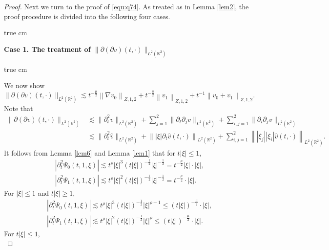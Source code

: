 \documentclass[11pt,twoside]{article}
\newcommand{\R}{\mathbb R}
\newcommand{\p}{\partial}
\newcommand{\f}{\frac}
\theoremstyle{plain}
\theoremstyle{definition}
\theoremstyle{remark}
\numberwithin{equation}{section}
\begin{document}
\begin{proof}
Next we turn to the proof of \eqref{equ:q74}. As treated as in  Lemma \ref{lem2}, the proof
procedure is divided into the following four cases.

 true cm

{\bf Case 1.  The treatment  of $\|\p(\p v)(t, \cdot)\|_{L^2(\R^2)}$ }

 true cm

We now show
\begin{equation}\label{equ:q78}
\|\p(\p v)(t, \cdot)\|_{L^2(\R^2)} \lesssim t^{-\f{\mu}{2}}\left\|\nabla v_0\right\|_{Z, 1, 2}
+t^{-\f{\mu}{2}}\left\|v_1\right\|_{Z, 1,2}+t^{-1}\left\|v_0+v_1\right\|_{Z, 1, 2}.
\end{equation}
Note that
\begin{equation}\label{equ:q78-1}
\begin{aligned}
\|\p(\p v)(t, \cdot)\|_{L^2(\R^2)} & \lesssim\|\p_t^2v\|_{L^2(\R^2)}+\sum_{j=1}^2\|\p_t\p_jv\|_{L^2(\R^2)}+\sum_{i,j=1}^2\|\p_i\p_jv\|_{L^2(\R^2)}\\
& \lesssim \|\p_t^2\hat{v}\|_{L^2(\R^2)}+\left\||\xi|\p_t\hat{v}(t, \cdot)\right\|_{L^2(\R^2)}+ \sum_{i,j=1}^2\left\||\xi_j||\xi_i|\hat{v}(t, \cdot)\right\|_{L^2(\R^2)}.
\end{aligned}
\end{equation}
It follows from Lemma \ref{lem6} and Lemma \ref{lem1} that for $t|\xi|\leq1$,
\begin{equation}\label{p-1}
\begin{aligned}
& \left|\p_t^2\Psi_0(t, 1,\xi)\right| \lesssim t^\rho|\xi|^3(t|\xi|)^{-\f{1}{2}}|\xi|^{-\f{1}{2}}= t^{-\frac{\mu}{2}}|\xi|\cdot|\xi|, \\
& \left|\p_t^2\Psi_1(t, 1, \xi)\right|  \lesssim t^\rho|\xi|^2(t|\xi|)^{-\f{1}{2}}|\xi|^{-\f{1}{2}}= t^{-\frac{\mu}{2}}\cdot|\xi|.
\end{aligned}
\end{equation}
For  $|\xi|\leq1$ and $t|\xi|\geq1$,
\begin{equation}\label{p-2}
\begin{aligned}
& \left|\p_t^2\Psi_0(t, 1,\xi)\right| \lesssim t^\rho|\xi|^3(t|\xi|)^{-\f{1}{2}}|\xi|^{\rho-1}\leq (t|\xi|)^{-\frac{\mu}{2}}\cdot|\xi|, \\
& \left|\p_t^2\Psi_1(t, 1, \xi)\right|  \lesssim t^\rho|\xi|^2(t|\xi|)^{-\f{1}{2}}|\xi|^{\rho}\leq (t|\xi|)^{-\frac{\mu}{2}}\cdot|\xi|.
\end{aligned}
\end{equation}
For $t|\xi|\leq1$,
\begin{equation}\label{p-3}

\end{equation}
\end{proof}
\end{document}
